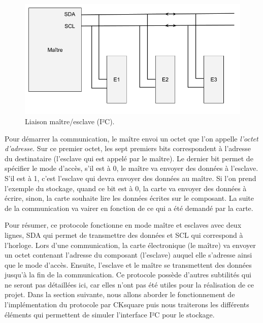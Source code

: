 \documentclass[a4paper]{article}
\begin{document}
\begin{figure}[h!]
  \begin{center}
    \includegraphics[scale=0.4]{./img/schema-i2c.png}
    \caption{Liaison maître/esclave (I²C).}
    \label{fig:schemai2c}
  \end{center}
\end{figure}

Pour démarrer la communication, le maître envoi un octet que l'on appelle
\textit{l'octet d'adresse}. Sur ce premier octet, les sept premiers bits
correspondent à l'adresse du destinataire (l'esclave qui est appelé par le
maître). Le dernier bit permet de spécifier le mode d'accès, s'il est à 0, le
maître va envoyer des données à l'esclave. S'il est à 1, c'est l'esclave qui
devra envoyer des données au maître. Si l'on prend l'exemple du stockage, quand
ce bit est à 0, la carte va envoyer des données à écrire, sinon, la carte
souhaite lire les données écrites sur le composant. La suite de la communication
va vairer en fonction de ce qui a été demandé par la carte.

Pour résumer, ce protocole fonctionne en mode maître et esclaves avec deux
lignes, SDA qui permet de transmettre des données et SCL qui correspond à
l'horloge. Lors d'une communication, la carte électronique (le maître) va
envoyer un octet contenant l'adresse du composant (l'esclave) auquel elle
s'adresse ainsi que le mode d'accès. Ensuite, l'esclave et le maître se
transmettent des données jusqu'à la fin de la communication. Ce protocole
possède d'autres subtilités qui ne seront pas détaillées ici, car elles n'ont pas
été utiles pour la réalisation de ce projet. Dans la section suivante, nous allons
aborder le fonctionnement de l'implémentation du protocole par CKsquare
puis nous traiterons les différents éléments qui permettent de simuler
l'interface I²C pour le stockage.
\end{document}
